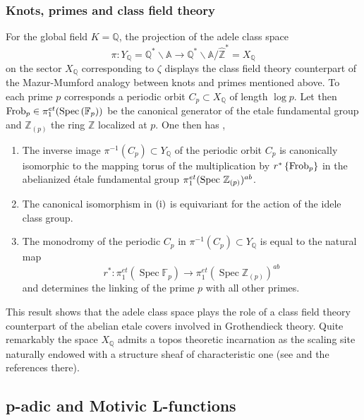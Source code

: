 \documentclass{article}
\def\F{{\mathbb F}}
\def\Q{{\mathbb Q}}
\def\Z{{\mathbb Z}}
\def\Spec{{\rm Spec\,}}
\begin{document}
    \subsubsection{Knots, primes and class field theory}\label{adelic}
    For the global field $K=\Q$, the projection  of the adele class space
    $$
    \pi:Y_\Q=\mathbb{Q}^*\backslash \mathbb{A}\to \mathbb{Q}^*\backslash \mathbb{A}/\hat\Z^*=X_\Q
    $$
    on the sector $X_\Q$ corresponding to $\zeta$ displays the class field theory counterpart of the Mazur-Mumford analogy between knots and primes mentioned above. To each prime $p$ corresponds a periodic orbit $C_p\subset X_\Q$ of length $\log p$. 
    Let then ${\rm F r o b}_{p}\in \pi_1^{e t}(\Spec(\F_p))$ be the canonical generator of the etale fundamental group and $\Z_{(p)}$ the ring $\Z$ localized at $p$. One then has \cite{ccknots}, 
     \begin{enumerate}
         \item[(i)] The inverse image $\pi^{-1}(C_p)\subset Y_\Q$ of the periodic orbit $C_p$  is canonically isomorphic to the mapping torus of the multiplication by $r^*\left\{{\rm F r o b}_{p}\right\}$  in the abelianized \'etale fundamental group $\pi_1^{e t}(\Spec \, \Z_{(p)})^{ab}$.
          \item[(ii)] The canonical isomorphism in $(\rm i)$ is equivariant for the action of the idele class group.
         \item[(iii)] The monodromy of the periodic $C_p$ in $\pi^{-1}(C_p)\subset Y_\Q$ is equal to the natural map $$r^*:\pi_1^{e t}\left(\operatorname{Spec} \mathbb{F}_p\right) \rightarrow \pi_1^{e t}(\operatorname{Spec} \mathbb{Z}_{(p)})^{a b}$$ and determines the linking of the prime $p$ with all other primes.
         \end{enumerate}
         This result shows that the adele class space plays the role of a class field theory counterpart of the abelian etale covers involved in Grothendieck theory. 
         Quite remarkably the space $X_\Q$ admits a topos theoretic incarnation as the scaling site naturally endowed with a structure sheaf of characteristic one (see \cite{Essay} and the references there).
     

\subsection{p-adic and Motivic L-functions}
\end{document}
